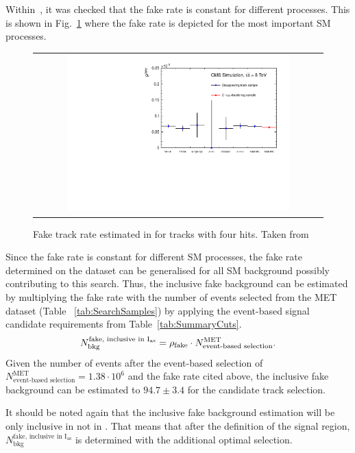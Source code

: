 Within~\cite{bib:CMS:DT_Thesis,bib:CMS:DT_8TeV_AN}, it was checked that the fake rate is constant for different processes.
This is shown in Fig.~\ref{fig:FakeRate} where the fake rate is depicted for the most important SM processes.
\begin{figure}[!b]
  \centering 
  \begin{tabular}{c}
    \includegraphics[width=0.79\textwidth]{figures/analysis/Background/fakeTrkRates.pdf}
  \end{tabular}
  \caption{Fake track rate estimated in \cite{bib:CMS:DT_Thesis,bib:CMS:DT_8TeV_AN} for tracks with four hits. Taken from \cite{bib:CMS:DT_8TeV_AN} }
  \label{fig:FakeRate}
\end{figure}
Since the fake rate is constant for different SM processes, the fake rate determined on the \Zlep dataset can be generalised for all SM background possibly contributing to this search.
Thus, the inclusive fake background can be estimated by multiplying the fake rate with the number of events selected from the MET dataset (Table ~\ref{tab:SearchSamples}) by applying the event-based signal candidate requirements from Table~\ref{tab:SummaryCuts}.
\begin{equation*}
N^{\text{fake, inclusive in I$_{\text{as}}$}}_{\text{bkg}} = \rho_{\text{fake}} \cdot N_{\text{event-based selection}}^{\text{MET}}.
\end{equation*}
Given the number of events after the event-based selection of $N_{\text{event-based selection}}^{\text{MET}} = 1.38\cdot10^6$ and the fake rate cited above, 
the inclusive fake background can be estimated to $94.7\pm3.4$ for the candidate track selection.

It should be noted again that the inclusive fake background estimation will be only inclusive in \ias not in \pt.
That means that after the definition of the signal region, $N^{\text{fake, inclusive in I$_{\text{as}}$}}_{\text{bkg}}$ is determined with the additional optimal \pt selection.

